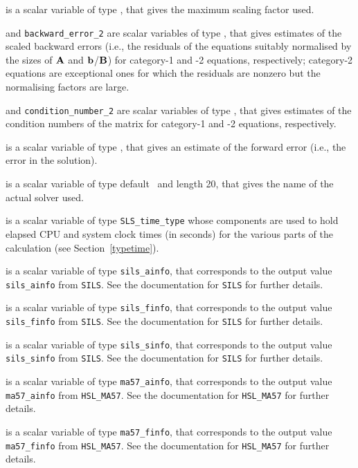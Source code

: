 \documentclass{galahad}
\newcommand{\packagename}{SLS}
\begin{document}
\begin{description}
 is a scalar variable of type \realdp,
that gives the maximum scaling factor used.

 and
{\tt backward\_error\_2} are scalar variables of type \realdp,
that gives estimates of the scaled backward errors (i.e., the residuals
of the equations suitably normalised by the sizes of ${\mathbf{A}}$ and 
${\mathbf{b}}$/${\mathbf{B}}$) for category-1 and -2 equations, respectively;
category-2 equations are exceptional ones for which the residuals are 
nonzero but the normalising factors are large.

 and
{\tt condition\_number\_2} are scalar variables of type \realdp,
that gives estimates of the condition numbers of the matrix
for category-1 and -2 equations, respectively.

 is a scalar variable of type \realdp,
that gives an estimate of the forward error (i.e., the error in the solution).

 is a scalar variable of type default \character\
and length 20, that  gives the name of the actual solver used.

 is a scalar variable of type {\tt \packagename\_time\_type}
whose components are used to hold elapsed CPU and system clock times
(in seconds) for the various parts of the calculation
(see Section~\ref{typetime}).

 is a scalar variable of type {\tt sils\_ainfo},
that corresponds to the output value {\tt sils\_ainfo}
from {\tt SILS}. See the documentation for {\tt SILS} for further
details.

 is a scalar variable of type {\tt sils\_finfo},
that corresponds to the output value {\tt sils\_finfo}
from {\tt SILS}. See the documentation for {\tt SILS} for further
details.

 is a scalar variable of type {\tt sils\_sinfo},
that corresponds to the output value {\tt sils\_sinfo}
from {\tt SILS}. See the documentation for {\tt SILS} for further
details.

 is a scalar variable of type {\tt ma57\_ainfo},
that corresponds to the output value {\tt ma57\_ainfo}
from {\tt HSL\_MA57}. See the documentation for {\tt HSL\_MA57} for further
details.

 is a scalar variable of type {\tt ma57\_finfo},
that corresponds to the output value {\tt ma57\_finfo}
from {\tt HSL\_MA57}. See the documentation for {\tt HSL\_MA57} for further
details.


\end{description}
\end{document}
